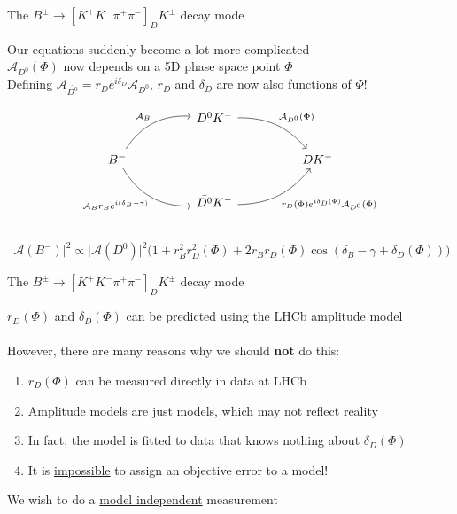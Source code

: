 \documentclass{beamer}
\begin{document}
\begin{frame}[fragile]{The $B^\pm\to[K^+K^-\pi^+\pi^-]_DK^\pm$ decay mode}
  \begin{center}
    Our equations suddenly become a lot more complicated\\
    \vspace{0.2cm}
    $\mathcal{A}_{D^0}(\Phi)$ now depends on a 5D phase space point $\Phi$\\
    \vspace{0.2cm}
    Defining $\mathcal{A}_{\bar{D^0}} = r_De^{i\delta_D}\mathcal{A}_{D^0}$, $r_D$ and $\delta_D$ are now also functions of $\Phi$!
  \end{center}
  \begin{equation*}
    \begin{tikzcd}[column sep=huge]
      & D^0K^- \arrow[dr, bend left = 25, "\mathcal{A}_{D^0}(\Phi)"] & \\
      B^- \arrow[ur, bend left, "\mathcal{A}_B"] \arrow[dr, bend right, "\mathcal{A}_B r_B e^{i(\delta_B - \gamma)}"'] & [5cm] & DK^- \\
      & \bar{D^0}K^- \arrow[ur, bend right = 25, "r_D(\Phi)e^{i\delta_D(\Phi)}\mathcal{A}_{D^0}(\Phi)"'] & \\
    \end{tikzcd}
  \end{equation*}
  \vspace{-0.5cm}
  \begin{equation*}
    \lvert\mathcal{A}(B^-)\lvert^2\propto\lvert\mathcal{A}(D^0)\lvert^2\Big(1 + r_B^2r_D^2(\Phi) + 2r_Br_D(\Phi)\cos(\delta_B - \gamma + \delta_D(\Phi))\Big)
  \end{equation*}
\end{frame}

\begin{frame}{The $B^\pm\to[K^+K^-\pi^+\pi^-]_DK^\pm$ decay mode}
  \begin{center}
    \Large $r_D(\Phi)$ and $\delta_D(\Phi)$ can be predicted using the LHCb amplitude model\\~\\
    \large However, there are many reasons why we should \textbf{not} do this:
  \end{center}
  \begin{enumerate}
    \setlength\itemsep{1.0em}
    \item{$r_D(\Phi)$ can be measured directly in data at LHCb}
    \item{Amplitude models are just models, which may not reflect reality}
    \item{In fact, the model is fitted to data that knows nothing about $\delta_D(\Phi)$}
    \item{It is \underline{impossible} to assign an objective error to a model!}
  \end{enumerate}
  \begin{center}
    \large We wish to do a \underline{model independent} measurement
  \end{center}
\end{frame}
\end{document}
